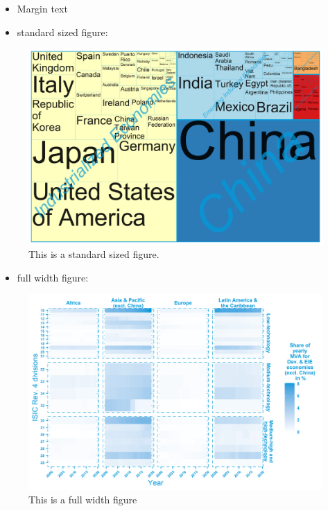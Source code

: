 \documentclass[
  openany, nofonts]{tufte-book}
\providecommand{\tightlist}{%
  \setlength{\itemsep}{0pt}\setlength{\parskip}{0pt}}
\begin{document}
\begin{itemize}
\tightlist
\item
  Margin text
\end{itemize}

\vspace{0.25cm}

\begin{itemize}
\tightlist
\item
  standard sized figure:
\end{itemize}

\begin{figure}
\includegraphics[width=1\linewidth]{./img/MVA2020share.png} \caption[This is a standard sized figure]{This is a standard sized figure.}\label{fig:unnamed-chunk-10}
\end{figure}

\begin{itemize}
\tightlist
\item
  full width figure:
\end{itemize}

\begin{figure}
\includegraphics[width=1\linewidth]{./img/ISIC2devxreg.png} \caption[This is a full width figure]{This is a full width figure}\label{fig:unnamed-chunk-11}
\end{figure}
\end{document}
